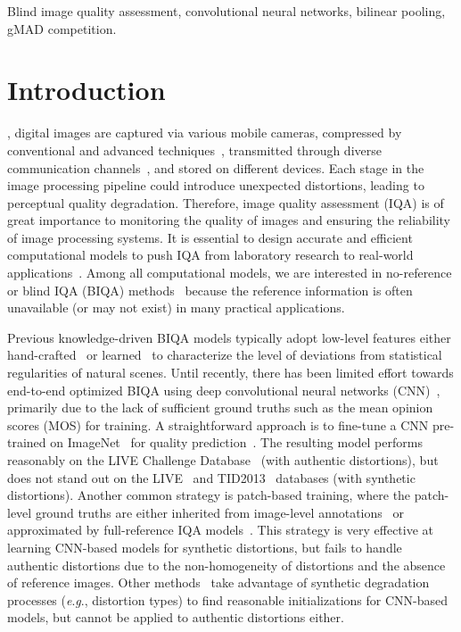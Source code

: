 \documentclass[journal]{IEEEtran}
\newcommand{\eg}{\textit{e}.\textit{g}.}
\begin{document}
\begin{IEEEkeywords}
Blind image quality assessment, convolutional neural networks, bilinear pooling, gMAD competition.
\end{IEEEkeywords}


\IEEEpeerreviewmaketitle
\section{Introduction}
, digital images are captured via various mobile cameras, compressed by conventional and advanced techniques~\cite{bovik2010handbook,BalleLS16a}, transmitted through diverse communication channels~\cite{duanmu2017quality}, and stored on different devices. Each stage in the image processing pipeline could introduce unexpected distortions, leading to perceptual quality degradation. Therefore, image quality assessment (IQA) is of great importance to monitoring the quality of images and ensuring the reliability of image processing systems.
It is essential to design accurate and efficient computational models to push IQA from laboratory research to real-world applications~\cite{wang2006modern,rehman2015display}. Among all computational models, we are interested in no-reference or blind IQA (BIQA) methods~\cite{wang2011reduced} because the reference information is often unavailable (or may not exist) in many practical applications.



Previous knowledge-driven BIQA models typically adopt low-level features either hand-crafted~\cite{mittal2012no} or learned~\cite{ye2012unsupervised} to characterize the level of deviations from statistical regularities of natural scenes. Until recently, there has been limited effort towards end-to-end optimized BIQA using deep convolutional neural networks (CNN)~\cite{kang2014convolutional,Ma2018End}, primarily due to the lack of sufficient ground truths such as the mean opinion scores (MOS) for training. A straightforward approach is to fine-tune a CNN pre-trained on ImageNet~\cite{deng2009imagenet} for quality prediction~\cite{kim2017deep}.
The resulting model performs reasonably on the LIVE Challenge Database~\cite{ghadiyaram2016massive} (with authentic distortions), but does not stand out on the LIVE~\cite{sheikh2006statistical} and TID2013~\cite{ponomarenko2013color} databases (with synthetic distortions). Another common strategy is patch-based training, where the patch-level ground truths are either inherited from image-level annotations~\cite{kang2014convolutional} or approximated by full-reference IQA models~\cite{kim2017fully}. This strategy is very effective at learning CNN-based models for synthetic distortions, but fails to handle authentic distortions due to the non-homogeneity of distortions and the absence of reference images. Other methods~\cite{Kang2015Simultaneous,Ma2018End} take advantage of  synthetic degradation processes (\eg, distortion types) to find reasonable initializations for CNN-based models, but cannot be applied to authentic distortions either.
\end{document}
